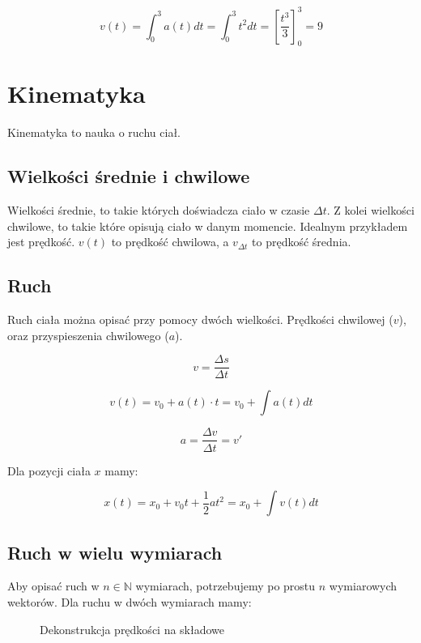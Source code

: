 \documentclass{../notatki}
\begin{document}
$$
v(t) = \int^3_0 a(t) dt = \int^3_0 t^2 dt = \left[\frac{t^3}{3}\right]^3_0 = 9
$$

\section{Kinematyka}

Kinematyka to nauka o ruchu ciał.

\subsection{Wielkości średnie i chwilowe}

Wielkości średnie, to takie których doświadcza ciało w czasie $\Delta t$.
Z kolei wielkości chwilowe, to takie które opisują ciało w danym momencie.
Idealnym przykładem jest prędkość. $v(t)$ to prędkość chwilowa, a $v_{\Delta t}$
to prędkość średnia.

\subsection{Ruch}

Ruch ciała można opisać przy pomocy dwóch wielkości. Prędkości chwilowej ($v$),
oraz przyspieszenia chwilowego ($a$).

$$
v = \frac{\Delta s}{\Delta t}
$$

$$
v(t) = v_0 + a(t) \cdot t = v_0 + \int a(t) dt
$$

$$
a = \frac{\Delta v}{\Delta t} = v'
$$

Dla pozycji ciała $x$ mamy:

$$
x(t) = x_0 + v_0t + \frac{1}{2}a t^2 = x_0 + \int v(t) dt
$$

\subsection{Ruch w wielu wymiarach}

Aby opisać ruch w $n \in \mathbb{N}$ wymiarach, potrzebujemy po prostu $n$
wymiarowych wektorów. Dla ruchu w dwóch wymiarach mamy:

\begin{figure*}[ht]
  \centering
  \caption{Dekonstrukcja prędkości na składowe}
\end{figure*}
\end{document}
